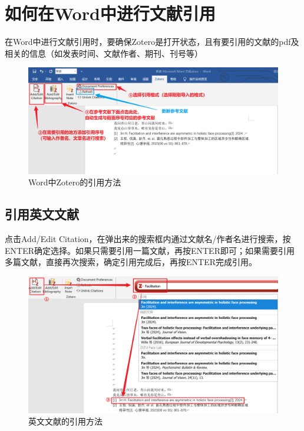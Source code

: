 \documentclass[]{ctexbook}
\theoremstyle{definition}
\theoremstyle{definition}
\theoremstyle{definition}
\theoremstyle{definition}
\theoremstyle{remark}
\begin{document}
\section{如何在Word中进行文献引用}\label{ux5982ux4f55ux5728wordux4e2dux8fdbux884cux6587ux732eux5f15ux7528}

在Word中进行文献引用时，要确保Zotero是打开状态，且有要引用的文献的pdf及相关的信息（如发表时间、文献作者、期刊、刊号等）

\begin{figure}

{\centering \includegraphics[width=1\linewidth]{img/zotero-cite-cn/ciation1} 

}

\caption{Word中Zotero的引用方法}\label{fig:word-ciation}
\end{figure}

\subsection{引用英文文献}\label{ux5f15ux7528ux82f1ux6587ux6587ux732e}

点击Add/Edit Citation，在弹出来的搜索框内通过文献名/作者名进行搜索，按ENTER确定选择。如果只需要引用一篇文献，再按ENTER即可；如果需要引用多篇文献，直接再次搜索，确定引用完成后，再按ENTER完成引用。

\begin{figure}

{\centering \includegraphics[width=1\linewidth]{img/zotero-cite-cn/ciation2} 

}

\caption{英文文献的引用方法}\label{fig:English-ciation}
\end{figure}
\end{document}
